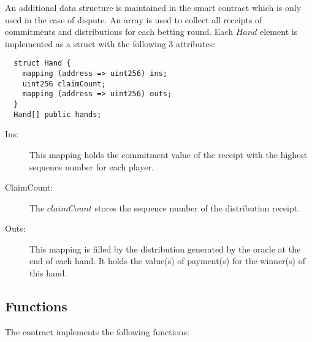 An additional data structure is maintained in the smart contract which is only used in the case of dispute. An array is used to collect all receipts of commitments and distributions for each betting round. Each \(Hand\) element is implemented as a struct with the following 3 attributes:

\begin{verbatim}
  struct Hand {
    mapping (address => uint256) ins;
    uint256 claimCount;
    mapping (address => uint256) outs;
  }
  Hand[] public hands;
\end{verbatim}

\begin{description}
\item[Ins:] This mapping holds the commitment value of the receipt with the highest sequence number for each player.
\item[ClaimCount:] The \(claimCount\) stores the sequence number of the distribution receipt. 
\item[Outs:] This mapping is filled by the distribution generated by the oracle at the end of each hand. It holds the value(s) of payment(s) for the winner(s) of this hand.
\end{description}


\subsection{Functions}

The contract implements the following functions:


